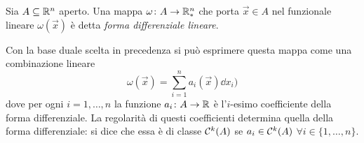 \begin{definizione} \label{d:forma-diff-lineare}
	Sia $A\subseteq\mathbb{R}^n$ aperto. Una mappa $\omega\colon A\to\mathbb{R}^n_*$ che porta $\vec x\in A$ nel funzionale lineare $\omega(\vec x)$ è detta \emph{forma differenziale lineare}.
\end{definizione}
Con la base duale scelta in precedenza si può esprimere questa mappa come una combinazione lineare
\begin{equation*}
	\omega(\vec x)=\sum_{i=1}^na_i(\vec x)\dd x_i)
\end{equation*}
dove per ogni $i=1,\dots,n$ la funzione $a_i\colon A\to\mathbb{R}$ è l'$i$-esimo coefficiente della forma differenziale.
La regolarità di questi coefficienti determina quella della forma differenziale: si dice che essa è di classe $\mathcal{C}^{{k}}(A)$ se $a_i\in\mathcal{C}^{{k}}(A)$ $\forall i\in\{1,\dots,n\}$.

